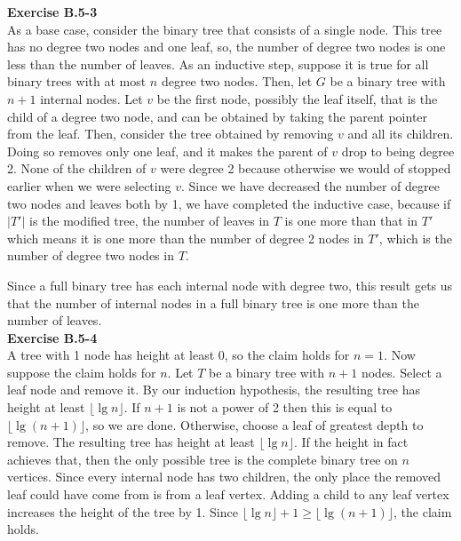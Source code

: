 \documentclass{article}
\begin{document}
\noindent\textbf{Exercise B.5-3}\\
As a base case, consider the binary tree that consists of a single node. This tree has no degree two nodes and one leaf, so, the number of degree two nodes is one less than the number of leaves. As an inductive step, suppose it is true for all binary trees with at most $n$ degree two nodes. Then, let $G$ be a binary tree with $n+1$ internal nodes. Let $v$ be the first node, possibly the leaf itself, that is the child of a degree two node, and can be obtained by taking the parent pointer from the leaf. Then, consider the tree obtained by removing $v$ and all its children. Doing so removes only one leaf, and it makes the parent of $v$ drop to being degree 2. None of the children of $v$ were degree 2 because otherwise we would of stopped earlier when we were selecting $v$. Since we have decreased the number of degree two nodes and leaves both by 1, we have completed the inductive case, because if $|T'|$ is the modified tree, the number of leaves in $T$ is one more than that in $T'$ which means it is one more than the number of degree 2 nodes in $T'$, which is the number of degree two nodes in $T$.

Since a full binary tree has each internal node with degree two, this result gets us that the number of internal nodes in a full binary tree is one more than the number of leaves.\\

\noindent\textbf{Exercise B.5-4}\\

A tree with 1 node has height at least 0, so the claim holds for $n=1$.  Now suppose the claim holds for $n$.  Let $T$ be a binary tree with $n+1$ nodes.  Select a leaf node and remove it. By our induction hypothesis, the resulting tree has height at least $\lfloor \lg n \rfloor$. If $n+1$ is not a power of 2 then this is equal to $\lfloor \lg(n+1) \rfloor$, so we are done.  Otherwise, choose a leaf of greatest depth to remove.  The resulting tree has height at least $\lfloor \lg n \rfloor$.  If the height in fact achieves that, then the only possible tree is the complete binary tree on $n$ vertices.  Since every internal node has two children, the only place the removed leaf could have come from is from a leaf vertex.  Adding a child to any leaf vertex increases the height of the tree by 1.  Since $\lfloor \lg n\rfloor + 1 \geq \lfloor \lg(n+1) \rfloor$, the claim holds. \\
\end{document}
